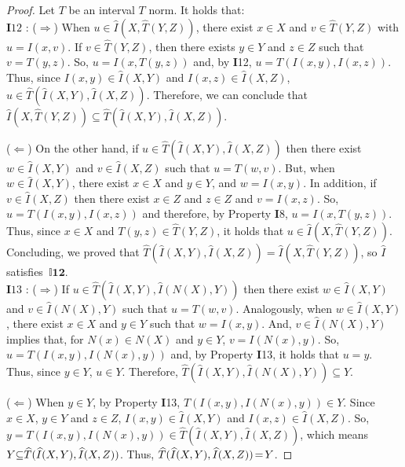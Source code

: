 \documentclass[12pt]{article}
\theoremstyle{plain}
\theoremstyle{remark}
\theoremstyle{definition}
\theoremstyle{proposition}
\newcommand{\II}{\mathbb{I} }
\begin{document}
\begin{proof}
Let $T$ be an interval $T$ norm. It holds that:\\
\textbf{I}$12$ : ($\Rightarrow$) When $u\in \widehat{I}(X,\widehat{T}(Y,Z))$, there exist
$x\in X$ and $v\in \widehat{T}(Y,Z)$ with $u=I(x,v)$. If $v\in
\widehat{T}(Y,Z)$, then there exists $y\in Y$ and $z\in Z$ such that
$v=T(y,z)$. So, $u=I(x,T(y,z))$ and, by \textbf{I}12,
$u=T(I(x,y),I(x,z))$. Thus, since $I(x,y)\in \widehat{I}(X,Y)$ and  $I(x,z)\in
\widehat{I}(X,Z)$, $u\in \widehat{T}(\widehat{I}(X,Y),\widehat{I}(X,Z))$.
Therefore, we can conclude that $\widehat{I}(X,\widehat{T}(Y,Z))\subseteq
\widehat{T}(\widehat{I}(X,Y),\widehat{I}(X,Z))$.

($\Leftarrow$) On the other hand, if $u\in \widehat{T}(\widehat{I}(X,Y),\widehat{I}(X,Z))$ then there exist $w\in \widehat{I}(X,Y)$ and $v\in \widehat{I}(X,Z)$ such that $u=T(w,v)$.
 But, when $w\in
\widehat{I}(X,Y)$, there exist $x\in X$ and $y\in Y$, and
$w=I(x,y)$. In addition, if $v\in
\widehat{I}(X,Z)$ then there exist $x\in Z$ and $z\in Z$ and
$v=I(x,z)$. So, $u=T(I(x,y),I(x,z))$ and therefore, by Property \textbf{I}8,
$u=I(x, T(y,z))$. Thus, since $x\in X$ and  $T(y,z)\in \widehat{T}(Y,Z)$, it holds that $u\in \widehat{I}(X,\widehat{T}(Y,Z))$. Concluding, we proved that
$\widehat{T}(\widehat{I}(X,Y),\widehat{I}(X,Z))=
\widehat{I}(X,\widehat{T}(Y,Z))$, so $\widehat{I}$ satisfies~$\II\mathbf{12}$. \\
%
\textbf{I}$13$ :  ($\Rightarrow$) If $u\in \widehat{T}(\widehat{I}(X,Y),\widehat{I}(N(X),Y))$ then there exist $w\in \widehat{I}(X,Y)$ and $v\in \widehat{I}(N(X),Y)$ such that $u=T(w,v)$.
Analogously, when $w\in
\widehat{I}(X,Y)$, there exist $x\in X$ and $y\in Y$ such that
$w=I(x,y)$. And, $v\in
\widehat{I}(N(X),Y)$ implies that, for $N(x)\in N(X)$ and $y\in Y$,
$v=I(N(x),y)$. So, $u=T(I(x,y),I(N(x),y))$ and, by Property \textbf{I}13, it holds that
$u=y$. Thus, since $y\in Y$, $u\in Y$.  Therefore,
$\widehat{T}(\widehat{I}(X,Y),\widehat{I}(N(X),Y)) \subseteq Y$.

($\Leftarrow$) When $y \in Y$, by Property \textbf{I}13, $T(I(x,y),I(N(x),y)) \in Y$. Since $x\in X$, $y\in Y$ and $z\in Z$, $I(x,y) \in \widehat{I}(X,Y)$ and $I(x,z) \in \widehat{I}(X,Z)$. So, $y = T(I(x,y),I(N(x),y)) \in \widehat{T}(\widehat{I}(X,Y),\widehat{I}(X,Z))$, which means $Y\hspace{-0.1cm}\subseteq\hspace{-0.1cm}\widehat{T}(\widehat{I}(X,Y),\widehat{I}(X,Z))$.
Thus, $\widehat{T}(\widehat{I}(X,Y),\widehat{I}(X,Z))\hspace{-0.05cm}=\hspace{-0.05cm}Y$.
\end{proof}
\end{document}
